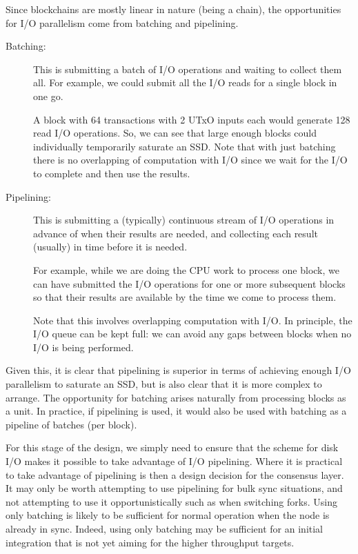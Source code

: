 \documentclass[11pt,a4paper]{article}
\begin{document}
Since blockchains are mostly linear in nature (being a chain), the opportunities
for I/O parallelism come from batching and pipelining.
\begin{description}
\item[Batching:] This is submitting a batch of I/O operations and waiting to
                collect them all. For example, we could submit all the I/O
                reads for a single block in one go.

                A block with 64 transactions with 2 UTxO inputs each would
                generate 128 read I/O operations. So, we can see that large enough blocks
                could individually temporarily saturate an SSD. Note that with
                just batching there is no overlapping of computation with I/O
                since we wait for the I/O to complete and then use the results.

\item[Pipelining:] This is submitting a (typically) continuous stream of I/O
                operations in advance of when their results are needed, and
                collecting each result (usually) in time before it is needed.

                For example, while we are doing the CPU work to process one
                block, we can have submitted the I/O operations for one or more
                subsequent blocks so that their results are available by the
                time we come to process them.

                Note that this involves overlapping computation with I/O.
                In principle, the I/O queue can be kept full: we can avoid
                any gaps between blocks when no I/O is being performed.
\end{description}
Given this, it is clear that pipelining is superior in terms of achieving
enough I/O parallelism to saturate an SSD, but is also clear that it is more
complex to arrange. The opportunity for batching arises naturally from
processing blocks as a unit. In practice, if pipelining is used, it would also
be used with batching as a pipeline of batches (per block).

For this stage of the design, we simply need to ensure that the
scheme for disk I/O makes it possible to take advantage of I/O pipelining.
Where it is practical to take advantage of pipelining is then a design decision
for the consensus layer. It may only be worth attempting to use pipelining for
bulk sync situations, and not attempting to use it opportunistically such as
when switching forks. Using only batching is likely to be sufficient for normal
operation when the node is already in sync. Indeed, using only batching may be
sufficient for an initial integration that is not yet aiming for the higher
throughput targets.
\end{document}
